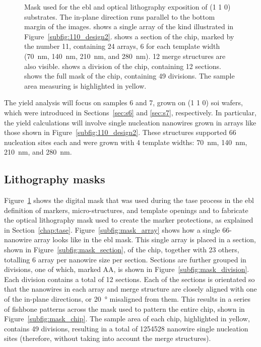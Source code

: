 \begin{figure}
{    }
    \caption[Mask used for the \acs{ebl} and optical lithography exposition of \hkl(1 1 0) substrtates.]{Mask used for the \acs{ebl} and optical lithography exposition of \hkl(1 1 0) substrates. The in-plane  direction runs parallel to the bottom margin of the images.  shows a single array of the kind illustrated in Figure~\ref{subfig:110_design2}.  shows a section of the chip, marked by the number 11, containing \num{24} arrays, \num{6} for each template width (\qty{70}{nm}, \qty{140}{nm}, \qty{210}{nm}, and \qty{280}{nm}). \num{12} merge structures are also visible.  shows a division of the chip, containing \num{12} sections.  shows the full mask of the chip, containing \num{49} divisions. The sample area measuring  is highlighted in yellow.}
    \label{fig:wafer_mask}
\end{figure}

The yield analysis will focus on samples \num{6} and \num{7}, grown on \hkl(1 1 0) \acs{soi} wafers, which were introduced in Sections~\ref{sec:s6} and \ref{sec:s7}, respectively. In particular, the yield calculations will involve single nucleation nanowires grown in arrays like those shown in Figure~\ref{subfig:110_design2}. These structures supported \num{66} nucleation sites each and were grown with 4 template widths: \qty{70}{nm}, \qty{140}{nm}, \qty{210}{nm}, and \qty{280}{nm}.

\subsection{Lithography masks}

Figure~\ref{fig:wafer_mask} shows the digital mask that was used during the \acs{tase} process in the \acf{ebl} definition of markers, micro-structures, and template openings and to fabricate the optical lithography mask used to create the marker protections, as explained in Section~\ref{chap:tase}. Figure~\ref{subfig:mask_array} shows how a single \num{66}-nanowire array looks like in the \acs{ebl} mask. This single array is placed in a section, shown in Figure~\ref{subfig:mask_section}, of the chip, together with \num{23} others, totalling \num{6} array per nanowire size per section. Sections are further grouped in divisions, one of which, marked AA, is shown in Figure~\ref{subfig:mask_division}. Each division contains a total of \num{12} sections. Each of the sections is orientated so that the nanowires in each array and merge structure are closely aligned with one of the in-plane  directions, or \qty{20}{\degree} misaligned from them. This results in a series of fishbone patterns across the mask used to pattern the entire chip, shown in Figure~\ref{subfig:mask_chip}. The  sample area of each chip, highlighted in yellow, contains \num{49} divisions, resulting in a total of \num{1254528} nanowire single nucleation sites (therefore, without taking into account the merge structures). 

